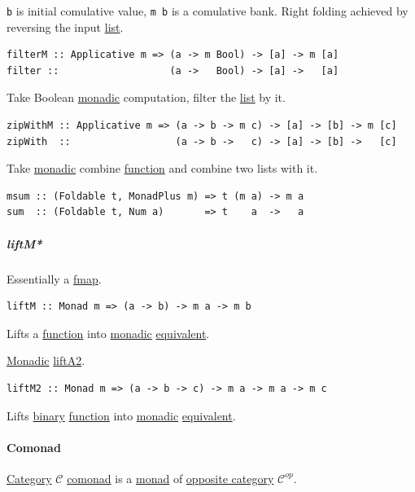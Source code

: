\documentclass[a4paper,14pt,oneside]{book}
\begin{document}
\texttt{b} is initial comulative value, \texttt{m b} is a comulative bank.
Right folding achieved by reversing the input \hyperref[org8286722]{list}.

\begin{verbatim}
filterM :: Applicative m => (a -> m Bool) -> [a] -> m [a]
filter ::                   (a ->   Bool) -> [a] ->   [a]
\end{verbatim}

Take Boolean \hyperref[org17c3c9d]{monadic} computation, filter the \hyperref[org8286722]{list} by it.

\begin{verbatim}
zipWithM :: Applicative m => (a -> b -> m c) -> [a] -> [b] -> m [c]
zipWith  ::                  (a -> b ->   c) -> [a] -> [b] ->   [c]
\end{verbatim}

Take \hyperref[org17c3c9d]{monadic} combine \hyperref[orgb9cf8e6]{function} and combine two lists with it.

\begin{verbatim}
msum :: (Foldable t, MonadPlus m) => t (m a) -> m a
sum  :: (Foldable t, Num a)       => t    a  ->   a
\end{verbatim}

\subparagraph{\label{org94d9043}liftM*}
\label{sec:org674d245}
\label{sec:org860d830}
Essentially a \hyperref[orgff15575]{fmap}.

\begin{verbatim}
liftM :: Monad m => (a -> b) -> m a -> m b
\end{verbatim}

Lifts a \hyperref[orgb9cf8e6]{function} into \hyperref[org17c3c9d]{monadic} \hyperref[org933a850]{equivalent}.

\label{sec:org59b9d55}
\hyperref[org17c3c9d]{Monadic} \hyperref[orgefe0cca]{liftA2}.
\begin{verbatim}
liftM2 :: Monad m => (a -> b -> c) -> m a -> m a -> m c
\end{verbatim}

Lifts \hyperref[orgc806291]{binary} \hyperref[orgb9cf8e6]{function} into \hyperref[org17c3c9d]{monadic} \hyperref[org933a850]{equivalent}.

\paragraph{\label{orgf0c827c}Comonad}
\label{sec:orgdb42c89}
\hyperref[org770b3fc]{Category} \(\mathcal{C}\) \hyperref[orgf0c827c]{comonad} is a \hyperref[org84837a3]{monad} of \hyperref[orgc37d399]{opposite category} \(\mathcal{C}^{op}\).
\end{document}
